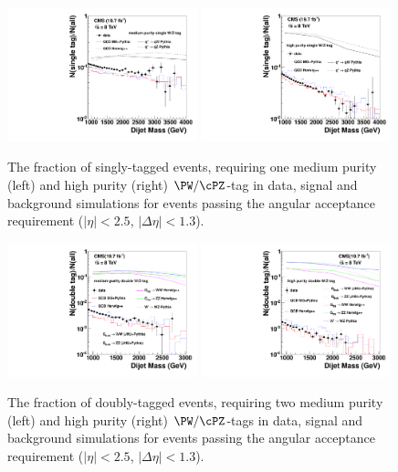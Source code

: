 \begin{figure}[htb]
\begin{center}
\includegraphics[width=0.49\textwidth]{figs/signal-acc-eff/single-tagging-eff-medium.pdf}
\includegraphics[width=0.49\textwidth]{figs/signal-acc-eff/single-tagging-eff.pdf}
\end{center}
\caption{The fraction of singly-tagged events, requiring one medium purity (left) 
  and high purity (right) $\PW/\cPZ$-tag in data,
  signal and background simulations for events passing the angular acceptance
  requirement ($|\eta| < 2.5$, $|\Delta\eta|<1.3$).}
\label{fig:singleefficiencies}
\end{figure}

\begin{figure}[htb]
\begin{center}
\includegraphics[width=0.49\textwidth]{figs/signal-acc-eff/double-tagging-eff-medium.pdf}
\includegraphics[width=0.49\textwidth]{figs/signal-acc-eff/double-tagging-eff.pdf}
\end{center}
\caption{The fraction of doubly-tagged events, requiring two medium purity (left) 
and high purity (right) $\PW/\cPZ$-tags in data,
  signal and background simulations for events passing the angular acceptance
  requirement ($|\eta| < 2.5$, $|\Delta\eta|<1.3$).}
\label{fig:doubleefficiencies}
\end{figure}
%


